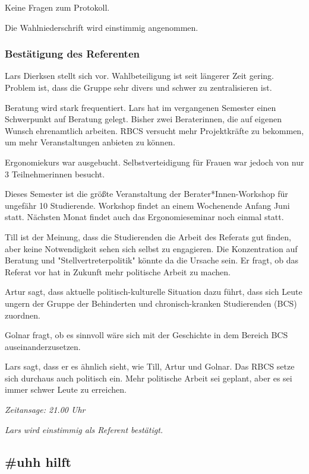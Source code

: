 \documentclass[ngerman,headheight=70pt]{scrartcl}
\begin{document}
    Keine Fragen zum Protokoll.

    Die Wahlniederschrift wird einstimmig angenommen.

    \subsubsection{Bestätigung des Referenten}

    Lars Dierksen stellt sich vor. Wahlbeteiligung ist seit längerer Zeit gering.
    Problem ist, dass die Gruppe sehr divers und schwer zu zentralisieren
    ist.

    Beratung wird stark frequentiert. Lars hat im vergangenen Semester
    einen Schwerpunkt auf Beratung gelegt. Bisher zwei Beraterinnen,
    die auf eigenen Wunsch ehrenamtlich arbeiten. RBCS versucht mehr
    Projektkräfte zu bekommen, um mehr Veranstaltungen anbieten zu können.

    Ergonomiekurs war ausgebucht. Selbstverteidigung für Frauen war jedoch
    von nur 3 Teilnehmerinnen besucht.

    Dieses Semester ist die größte Veranstaltung der Berater*Innen-Workshop
    für ungefähr 10 Studierende. Workshop findet an einem Wochenende
    Anfang Juni statt. Nächsten Monat findet auch das Ergonomieseminar noch einmal
    statt.

    Till ist der Meinung, dass die Studierenden die Arbeit des Referats gut finden,
    aber keine Notwendigkeit sehen sich selbst zu engagieren. Die Konzentration
    auf Beratung und "Stellvertreterpolitik" könnte da die Ursache sein. Er fragt,
    ob das Referat vor hat in Zukunft mehr politische Arbeit zu machen.

    Artur sagt, dass aktuelle politisch-kulturelle Situation dazu führt, dass
    sich Leute ungern der Gruppe der Behinderten und chronisch-kranken
    Studierenden (BCS) zuordnen.

    Golnar fragt, ob es sinnvoll wäre sich mit der Geschichte in dem Bereich
    BCS auseinanderzusetzen.

    Lars sagt, dass er es ähnlich sieht, wie Till, Artur und Golnar. Das RBCS
    setze sich durchaus auch politisch ein. Mehr politische Arbeit sei
    geplant, aber es sei immer schwer Leute zu erreichen.

    \textit{Zeitansage: 21.00 Uhr}

    \textit{Lars wird einstimmig als Referent bestätigt.}

    \subsection{\#uhh hilft}
\end{document}
